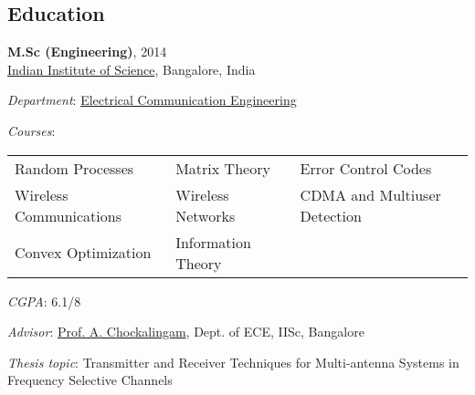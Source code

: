\documentclass[line]{resume}
\begin{document}
{\begin{resume}
    \section{\mysidestyle Education} \vspace{1mm}
    \textbf{M.Sc (Engineering)}, 2014 \\%
   \href{http://www.iisc.ernet.in/}{{Indian Institute of Science}}, Bangalore, India %
    \begin{list2}
        \item \textit{Department}: \href{http://www.ece.iisc.ernet.in/}{Electrical Communication Engineering}        

        \item \textit{Courses}: \\
                       \begin{tabular}{l l l} 
                       \hspace{10mm} Random Processes & Matrix Theory & Error Control Codes \\
                       \hspace{10mm} Wireless Communications & Wireless Networks & CDMA and Multiuser Detection \\ 
                       \hspace{10mm} Convex Optimization & Information Theory &
                       \end{tabular}
                       
        \item \textit{CGPA}: 6.1/8  
        
        
        \item \textit{Advisor}: \href{http://www.ece.iisc.ernet.in/~achockal/}{Prof. A. Chockalingam}, Dept. of ECE, IISc, Bangalore  
        
        \item \textit{Thesis topic}: Transmitter and Receiver Techniques for Multi-antenna Systems in Frequency Selective Channels
              

\end{list2}
\end{resume}}
\end{document}

